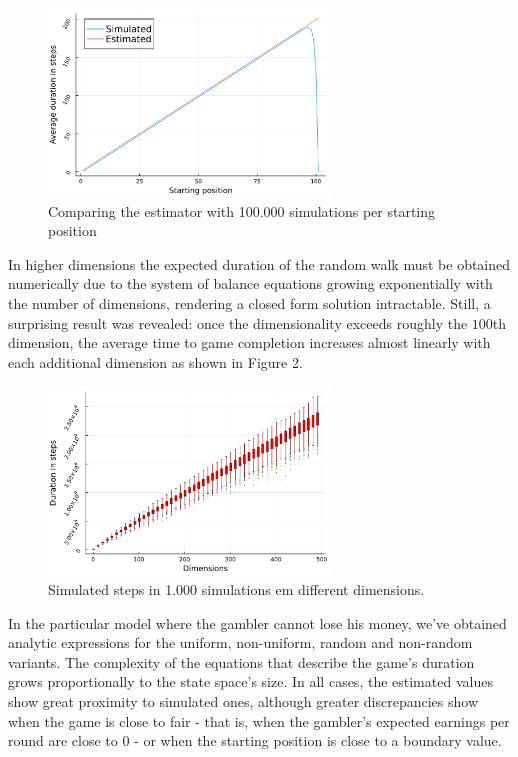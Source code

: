 \documentclass[a4paper,10pt,twocolumn]{article}
\begin{document}
\begin{figure}[H]
    \centering
    \includegraphics[width=7.5cm]{"graficoest-en.pdf"}
    \centering
    \caption{Comparing the estimator with 100.000 simulations per starting
    position}
\end{figure}

In higher dimensions the expected duration of the random walk must be obtained
numerically due to the system of balance equations growing exponentially with
the number of dimensions, rendering a closed form solution intractable. Still, a
surprising result was revealed: once the dimensionality exceeds roughly the
$100$th dimension, the average time to game completion increases almost linearly
with each additional dimension as shown in Figure 2.

\begin{figure}[h]
    \centering
    \includegraphics[width=7.5cm]{"boxplots-en.pdf"}
    \centering
    \caption{Simulated steps in 1.000 simulations em different dimensions.}
\end{figure}

In the particular model where the gambler cannot lose his money, we've obtained
analytic expressions for the uniform, non-uniform, random and non-random
variants. The complexity of the equations that describe the game's duration
grows proportionally to the state space's size. In all cases, the estimated
values show great proximity to simulated ones, although greater discrepancies
show when the game is close to fair - that is, when the gambler's expected
earnings per round are close to $0$ - or when the starting position is close to
a boundary value.
\end{document}
